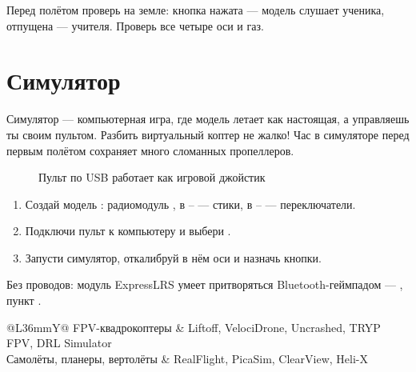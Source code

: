 \begin{caution}
Перед полётом проверь на земле: кнопка нажата --- модель слушает ученика, отпущена --- учителя.
Проверь все четыре оси и газ.
\end{caution}

\section{Симулятор}

\begin{simple}
Симулятор --- компьютерная игра, где модель летает как настоящая, а управляешь ты своим
пультом. Разбить виртуальный коптер не жалко! Час в симуляторе перед первым полётом
сохраняет много сломанных пропеллеров.
\end{simple}

\begin{figure}[H]
\centering
{}
\caption{Пульт по USB работает как игровой джойстик}
\end{figure}

\begin{enumerate}
  \item Создай модель : радиомодуль , в -- --- стики,
        в -- --- переключатели.
  \item Подключи пульт к компьютеру и выбери .
  \item Запусти симулятор, откалибруй в нём оси и назначь кнопки.
\end{enumerate}

Без проводов: модуль ExpressLRS умеет притворяться Bluetooth-геймпадом ---
, пункт .

\begin{center}\small
\renewcommand{\arraystretch}{1.2}
\begin{tabularx}{\linewidth}{@{}L{36mm}Y@{}}
\toprule
FPV-квадрокоптеры & Liftoff, VelociDrone, Uncrashed, TRYP FPV, DRL Simulator \\
Самолёты, планеры, вертолёты & RealFlight, PicaSim, ClearView, Heli-X \\
\bottomrule
\end{tabularx}
\end{center}

